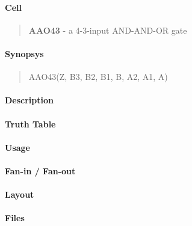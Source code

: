 \label{AAO43}
\paragraph{Cell}
\begin{quote}
    \textbf{AAO43} - a 4-3-input AND-AND-OR gate
\end{quote}

\paragraph{Synopsys}
\begin{quote}
    AAO43(Z, B3, B2, B1, B, A2, A1, A)
\end{quote}

\paragraph{Description}

%

\paragraph{Truth Table}
%

\paragraph{Usage}

\paragraph{Fan-in / Fan-out}

\paragraph{Layout}

\paragraph{Files}
